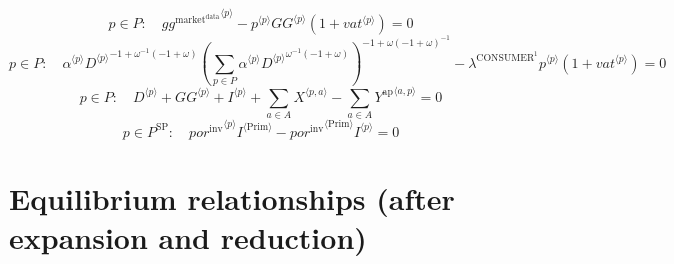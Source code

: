 \begin{equation}
p\in P\colon\quad {{g\!g}^{\mathrm{market}^{\mathrm{data}}}}^{\langle p\rangle} - {{p}^{\langle p\rangle}} {{{G\!G}}^{\langle p\rangle}} \left(1 + {{v\!a\!t}}^{\langle p\rangle}\right) = 0
\end{equation}
\begin{equation}
p\in P\colon\quad {{\alpha}^{\langle p\rangle}} {{{D}^{\langle p\rangle}}^{-1 + {\omega}^{-1} \left(-1 + \omega\right)}} {\left(\sum_{p\in P} {{\alpha}^{\langle p\rangle}} {{{D}^{\langle p\rangle}}^{{\omega}^{-1} \left(-1 + \omega\right)}}\right)^{-1 + {\omega} \left(-1 + \omega\right)^{-1}}} - {\lambda^{\mathrm{CONSUMER}^{\mathrm{1}}}} {{p}^{\langle p\rangle}} \left(1 + {{v\!a\!t}}^{\langle p\rangle}\right) = 0
\end{equation}
\begin{equation}
p\in P\colon\quad {D}^{\langle p\rangle} + {{G\!G}}^{\langle p\rangle} + {I}^{\langle p\rangle} + \sum_{a\in A} {X}^{\langle p,a\rangle} - \sum_{a\in A} {Y^{\mathrm{ap}}}^{\langle a,p\rangle} = 0
\end{equation}
\begin{equation}
p\in P^{\mathrm{SP}}\colon\quad {{{p\!o\!r}^{\mathrm{inv}}}^{\langle p\rangle}} {{I}^{\langle \mathrm{Prim}\rangle}} - {{{p\!o\!r}^{\mathrm{inv}}}^{\langle \mathrm{\mathrm{Prim}}\rangle}} {{I}^{\langle p\rangle}} = 0
\end{equation}



\section{Equilibrium relationships (after expansion and reduction)}


